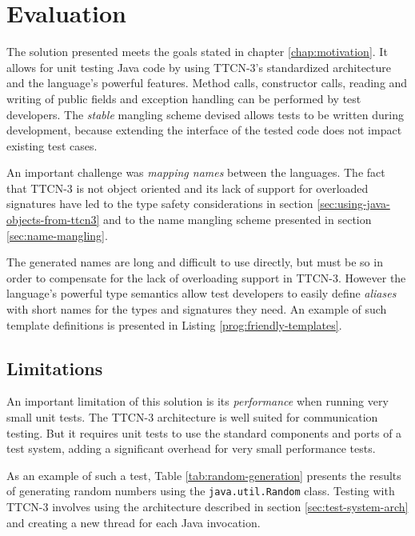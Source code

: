 \chapter{Evaluation}
\label{chap:evaluation}

The solution presented meets the goals stated
in chapter \ref{chap:motivation}.
It allows for unit testing Java code
by using \ac{TTCN-3}'s standardized architecture
and the language's powerful features.
Method calls, constructor calls, reading and writing of public fields
and exception handling can be performed by test developers.
The \emph{stable} mangling scheme devised
allows tests to be written during development,
because extending the interface of the tested code
does not impact existing test cases.

An important challenge was \emph{mapping names} between the languages.
The fact that \ac{TTCN-3} is not object oriented
and its lack of support for overloaded signatures
have led to the type safety considerations
in section \ref{sec:using-java-objects-from-ttcn3}
and to the name mangling scheme presented in section \ref{sec:name-mangling}.

The generated names are long and difficult to use directly,
but must be so in order to compensate for
the lack of overloading support in \ac{TTCN-3}.
However the language's powerful type semantics allow test developers
to easily define \emph{aliases} with short names for the
types and signatures they need.
An example of such template definitions is presented in
Listing \ref{prog:friendly-templates}.

\begin{program}
\caption{Defining templates with user-friendly names%
	\label{prog:friendly-templates}}
\end{program}


\section{Limitations}

An important limitation of this solution is its
\emph{performance} when running very small unit tests.
The \ac{TTCN-3} architecture is well suited for communication testing.
But it requires unit tests to use
the standard components and ports of a test system,
adding a significant overhead for very small performance tests.

As an example of such a test,
Table \ref{tab:random-generation} presents the results
of generating random numbers using the \verb=java.util.Random= class.
Testing with \ac{TTCN-3} involves using the architecture described
in section \ref{sec:test-system-arch}
and creating a new thread for each Java invocation.

